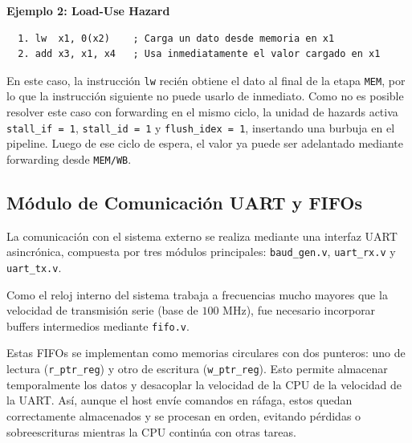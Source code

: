 \textbf{Ejemplo 2: Load-Use Hazard}
\begin{verbatim}
  1. lw  x1, 0(x2)    ; Carga un dato desde memoria en x1
  2. add x3, x1, x4   ; Usa inmediatamente el valor cargado en x1
\end{verbatim}

En este caso, la instrucción \texttt{lw} recién obtiene el dato al final de la etapa \texttt{MEM}, por lo que la instrucción siguiente no puede usarlo de inmediato. Como no es posible resolver este caso con forwarding en el mismo ciclo, la unidad de hazards activa \texttt{stall\_if = 1}, \texttt{stall\_id = 1} y \texttt{flush\_idex = 1}, insertando una burbuja en el pipeline. Luego de ese ciclo de espera, el valor ya puede ser adelantado mediante forwarding desde \texttt{MEM/WB}.

\subsection{Módulo de Comunicación UART y FIFOs}
La comunicación con el sistema externo se realiza mediante una interfaz UART asincrónica, compuesta por tres módulos principales: \texttt{baud\_gen.v}, \texttt{uart\_rx.v} y \texttt{uart\_tx.v}.

Como el reloj interno del sistema trabaja a frecuencias mucho mayores que la velocidad de transmisión serie (base de $100$ MHz), fue necesario incorporar buffers intermedios mediante \texttt{fifo.v}.

Estas FIFOs se implementan como memorias circulares con dos punteros: uno de lectura (\texttt{r\_ptr\_reg}) y otro de escritura (\texttt{w\_ptr\_reg}). Esto permite almacenar temporalmente los datos y desacoplar la velocidad de la CPU de la velocidad de la UART. Así, aunque el host envíe comandos en ráfaga, estos quedan correctamente almacenados y se procesan en orden, evitando pérdidas o sobreescrituras mientras la CPU continúa con otras tareas.